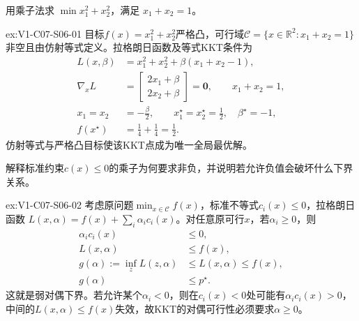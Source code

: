 \begin{SLChapterExercisePairSection}
\begin{exercise}\label{ex:V1-C07-S06-01}
用乘子法求 $\min x_1^2+x_2^2$，满足 $x_1+x_2=1$。
\end{exercise}
\label{sol:V1-C07-S06-01}
\begin{chapterexercisesolution}{ex:V1-C07-S06-01}
目标$f(x)=x_1^2+x_2^2$严格凸，可行域$\mathcal C=\{x\in\mathbb R^2:x_1+x_2=1\}$非空且由仿射等式定义。拉格朗日函数及等式KKT条件为
\[
\begin{aligned}
L(x,\beta)&=x_1^2+x_2^2+\beta(x_1+x_2-1),\\
\nabla_xL&=\begin{bmatrix}2x_1+\beta\\2x_2+\beta\end{bmatrix}
=\boldsymbol0,\qquad x_1+x_2=1,\\
x_1=x_2&=-\frac\beta2,\qquad
x_1^\star=x_2^\star=\frac12,\quad \beta^\star=-1,\\
f(x^\star)&=\frac14+\frac14=\frac12.
\end{aligned}
\]
仿射等式与严格凸目标使该KKT点成为唯一全局最优解。
\end{chapterexercisesolution}

\begin{exercise}\label{ex:V1-C07-S06-02}
解释标准约束$c(x)\le0$的乘子为何要求非负，并说明若允许负值会破坏什么下界关系。
\end{exercise}
\label{sol:V1-C07-S06-02}
\begin{chapterexercisesolution}{ex:V1-C07-S06-02}
考虑原问题$\min_{x\in\mathcal C}f(x)$，标准不等式$c_i(x)\le0$，拉格朗日函数
$L(x,\alpha)=f(x)+\sum_i\alpha_ic_i(x)$。对任意原可行$x$，若$\alpha_i\ge0$，则
\[
\begin{aligned}
\alpha_ic_i(x)&\le0,\\
L(x,\alpha)&\le f(x),\\
g(\alpha):=\inf_zL(z,\alpha)
&\le L(x,\alpha)\le f(x),\\
g(\alpha)&\le p^\star.
\end{aligned}
\]
这就是弱对偶下界。若允许某个$\alpha_i<0$，则在$c_i(x)<0$处可能有$\alpha_ic_i(x)>0$，中间的$L(x,\alpha)\le f(x)$失效，故KKT的对偶可行性必须要求$\alpha\ge0$。
\end{chapterexercisesolution}


\end{SLChapterExercisePairSection}

